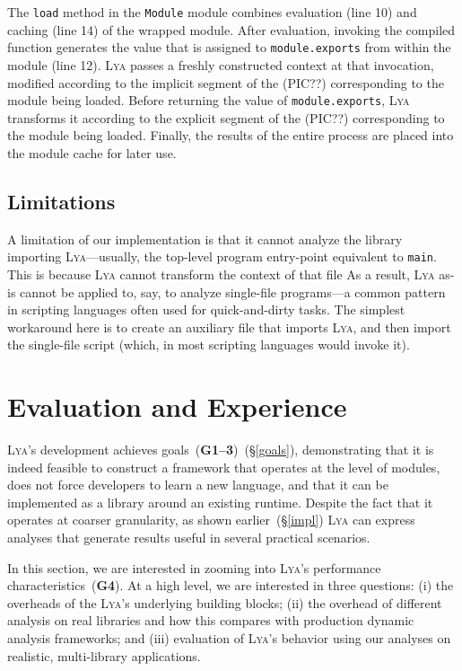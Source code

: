\documentclass[letterpaper,twocolumn,10pt]{article}
\newcommand{\ttt}[1]{\texttt{#1}}
\newcommand{\sx}[1]{(\S\ref{#1})}
\newcommand{\sys}{{\scshape Lya}\xspace}
\newcommand{\goal}[1]{(\textbf{G#1})\xspace}
\begin{document}
The \ttt{load} method in the \ttt{Module} module combines evaluation (line 10) and caching (line 14) of the wrapped module.
After evaluation, invoking the compiled function generates the value that is assigned to \ttt{module.exports} from within the module (line 12).
\sys passes a freshly constructed context at that invocation, modified according to the implicit segment of the (PIC??) corresponding to the module being loaded.
Before returning the value of \ttt{module.exports}, \sys transforms it according to the explicit segment of the (PIC??) corresponding to the module being loaded.
Finally, the results of the entire process are placed into the module cache for later use.

\subsection{Limitations}

A limitation of our implementation is that it cannot analyze the library importing \sys---usually, the top-level program entry-point equivalent to \ttt{main}.
This is because \sys cannot transform the context of that file
As a result, \sys as-is cannot be applied to, say, to analyze single-file programs---a common pattern in scripting languages often used for quick-and-dirty tasks.
The simplest workaround here is to create an auxiliary file that imports \sys, and then import the single-file script (which, in most scripting languages would invoke it).



\section{Evaluation and Experience}
\label{eval}

\sys's  development achieves goals~\goal{1--3}~\sx{goals}, demonstrating that it is indeed feasible to construct a framework that operates at the level of modules, 
does not force developers to learn a new language, and that it can be implemented as a library around an existing runtime.
Despite the fact that it operates at coarser granularity, as shown earlier~\sx{impl} \sys can express analyses that generate results useful in several practical scenarios.

In this section, we are interested in zooming into \sys's performance characteristics~\goal{4}.
At a high level, we are interested in three questions:
(i) the overheads of the \sys's underlying building blocks;
(ii) the overhead of different analysis on real libraries and how this compares with production dynamic analysis frameworks; and
(iii) evaluation of \sys's behavior using our analyses on realistic, multi-library applications.
\end{document}
